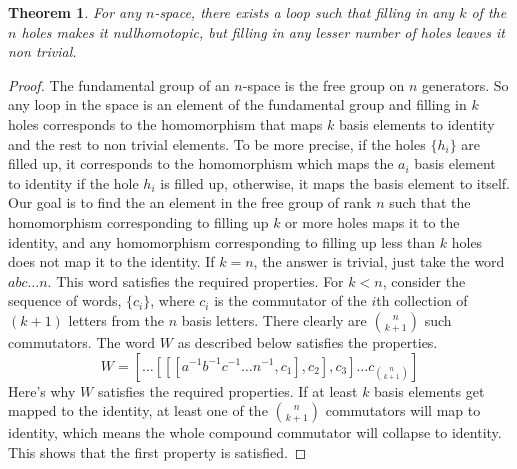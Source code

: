 \documentclass[12pt]{article}
\newtheorem{thm}{Theorem}[section]
\theoremstyle{definition}
\begin{document}
\begin{thm}
For any $n$-space, there exists a loop such that filling in any $k$ of the $n$ holes makes it \emph{nullhomotopic}, but filling in any lesser number of holes leaves it non trivial.
\end{thm}

\begin{proof}
The fundamental group of an $n$-space is the free group on $n$ generators. So any loop in the space is an element of the fundamental group and filling in $k$ holes corresponds to the homomorphism that maps $k$ basis elements to identity and the rest to non trivial elements. To be more precise, if the holes $\{h_i\}$ are filled up, it corresponds to the homomorphism which maps the $a_i$ basis element to identity if the hole $h_i$ is filled up, otherwise, it maps the basis element to itself. Our goal is to find the an element in the free group of rank $n$ such that the homomorphism corresponding to filling up $k$ or more holes maps it to the identity, and any homomorphism corresponding to filling up less than $k$ holes does not map it to the identity.
If $k=n$, the answer is trivial, just take the word $abc\ldots n$. This word satisfies the required properties. For $k<n$, consider the sequence of words, $\{c_i\}$, where $c_i$ is the commutator of the $i$th collection of $(k+1)$ letters from the $n$ basis letters. There clearly are $n \choose {k+1}$ such commutators. The word $W$ as described below satisfies the properties.
$$W = \left[ \ldots [[[a^{-1}b^{-1}c^{-1}\ldots n^{-1}, c_1], c_2], c_3] \ldots c_{n \choose{k+1}}\right]$$
Here's why $W$ satisfies the required properties. If at least $k$ basis elements get mapped to the identity, at least one of the $n \choose{k+1}$ commutators will map to identity, which means the whole compound commutator will collapse to identity. This shows that the first property is satisfied.


\end{proof}
\end{document}
